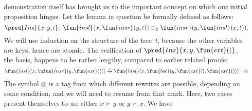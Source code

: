 demonstration itself has brought us to the important concept on which
our initial proposition hinges. Let the lemma in question be formally
defined as follows:
\begin{equation*}
\pred{Ins}{x,y,t} \colon \fun{insl}(x,\fun{insr}(y,t))
\equiv_2 \fun{insr}(y,\fun{insl}(x,t)).
\index{Ins@\predName{Ins}}
\end{equation*}
We will use induction on the structure of the tree~\(t\), because the
other variables are keys, hence are atomic. The verification of
\(\pred{Ins}{x,y,\fun{ext}()}\), the basis, happens to be rather
lengthy, compared to earlier related proofs:
\begin{equation*}
\begin{array}{@{}r@{\;}l@{\;}l@{\quad}r@{}}
  \fun{insl}(x,\ufun{insr}(y,\fun{ext}()))
& \xrightarrow{\smash{\iota}} &
  \fun{insl}(x,\fun{bst}(y,\fun{ext}(),\fun{ext}())) & \otimes
\end{array}
\end{equation*}
The symbol \(\otimes\) is a tag from which different rewrites are
possible, depending on some condition, and we will need to resume from
that mark. Here, two cases present themselves to us: either \(x \succ
y\) or \(y \succ x\). We have
